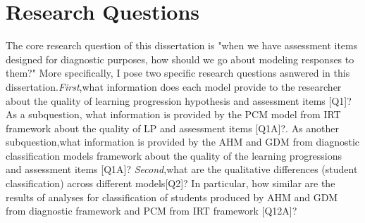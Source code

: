 \section{Research Questions}
The core research question of this dissertation is "when we have assessment items designed for diagnostic purposes, how should we go about modeling responses to them?" More specifically, I pose two specific research questions asnwered in this dissertation.{\em First},what information does each model provide to the researcher about the quality of learning progression hypothesis and assessment items [Q1]? As a subquestion, what information is provided by the PCM model from IRT framework about the quality of LP and assessment items  [Q1A]?. As another subquestion,what information is provided by the AHM and GDM from diagnostic classification models framework about the quality of the learning progressions and assessment items [Q1A]? {\em Second},what are the qualitative differences (student classification) across different models[Q2]? In particular, how similar are the results of analyses for classification of students produced by AHM and GDM from diagnostic framework and PCM from IRT framework [Q12A]? 

